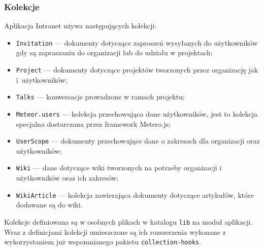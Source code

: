   \subsubsection{Kolekcje}
Aplikacja Intranet używa następujących kolekcji:
\begin{itemize}
 \item \verb|Invitation| --- dokumenty dotyczące zaproszeń wysyłanych do użytkowników gdy są zapraszaniu do organizacji lub do udziału w projektach;
 \item \verb|Project| --- dokumenty dotyczące projektów tworzonych przez organizację jak i~użytkowników;
 \item \verb|Talks| --- konwersacje prowadzone w ramach projektu;
 \item \verb|Meteor.users| --- kolekcja przechowująca dane użytkowników, jest to kolekcja specjalna dostarczana przez framework Metero.js;
 \item \verb|UserScope| --- dokumenty przechowujące dane o zakresach dla organizacji oraz użytkowników;
 \item \verb|Wiki| --- dane dotyczące wiki tworzonych na potrzeby organizacji i użytkowników oraz ich zakresów;
 \item \verb|WikiArticle| --- kolekcja zawierająca dokumenty dotyczące artykułów, które dodawane są do wiki.
\end{itemize}
Kolekcje definiowana są w osobnych plikach w katalogu \verb|lib| na moduł aplikacji. Wraz z definicjami kolekcji umieszczone są ich rozszerzenia wykonane z wykorzystaniem już wspomnianego pakietu \verb|collection-hooks|.


